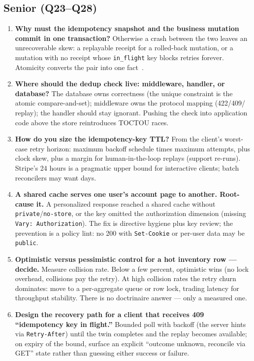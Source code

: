 \subsection*{Senior (Q23--Q28)}
\begin{enumerate}[label=\textbf{Q\arabic*.}, leftmargin=1.6cm, start=23]
  \item \textbf{Why must the idempotency snapshot and the business mutation
        commit in one transaction?}
        Otherwise a crash between the two leaves an unrecoverable skew: a
        replayable receipt for a rolled-back mutation, or a mutation with
        no receipt whose \texttt{in\_flight} key blocks retries forever.
        Atomicity converts the pair into one fact~\cite{kleppmann2017ddia}.
  \item \textbf{Where should the dedup check live: middleware, handler, or
        database?}
        The database owns correctness (the unique constraint is the atomic
        compare-and-set); middleware owns the protocol mapping (422/409/
        replay); the handler should stay ignorant. Pushing the check into
        application code above the store reintroduces TOCTOU races.
  \item \textbf{How do you size the idempotency-key TTL?}
        From the client's worst-case retry horizon: maximum backoff
        schedule times maximum attempts, plus clock skew, plus a margin
        for human-in-the-loop replays (support re-runs). Stripe's 24 hours
        is a pragmatic upper bound for interactive clients; batch
        reconcilers may want days.
  \item \textbf{A shared cache serves one user's account page to another.
        Root-cause it.}
        A personalized response reached a shared cache without
        \texttt{private}/\texttt{no-store}, or the key omitted the
        authorization dimension (missing \texttt{Vary: Authorization}).
        The fix is directive hygiene plus key review; the prevention is a
        policy lint: no 200 with \texttt{Set-Cookie} or per-user data may
        be \texttt{public}.
  \item \textbf{Optimistic versus pessimistic control for a hot inventory
        row --- decide.}
        Measure collision rate. Below a few percent, optimistic wins (no
        lock overhead, collisions pay the retry). At high collision rates
        the retry churn dominates: move to a per-aggregate queue or row
        lock, trading latency for throughput stability. There is no
        doctrinaire answer --- only a measured one.
  \item \textbf{Design the recovery path for a client that receives 409
        ``idempotency key in flight.''}
        Bounded poll with backoff (the server hints via
        \texttt{Retry-After}) until the twin completes and the replay
        becomes available; on expiry of the bound, surface an explicit
        ``outcome unknown, reconcile via GET'' state rather than guessing
        either success or failure.
\end{enumerate}

